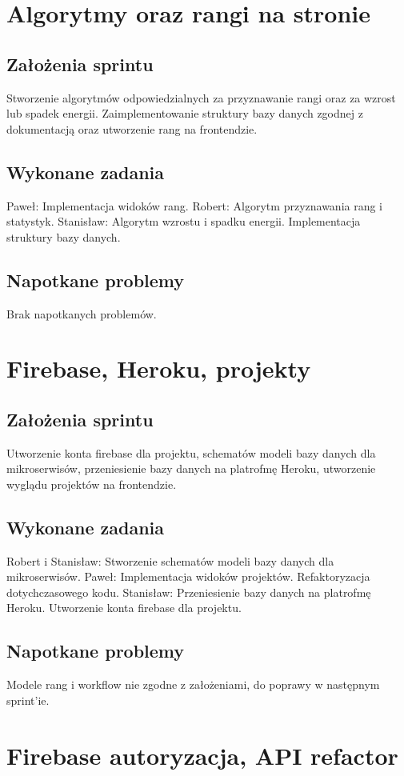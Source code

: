 \documentclass[a4paper,11pt]{report}
\begin{document}
\section {Algorytmy oraz rangi na stronie}
\subsection {Założenia sprintu}
Stworzenie algorytmów odpowiedzialnych za przyznawanie rangi oraz za wzrost lub spadek energii. Zaimplementowanie struktury bazy danych zgodnej z dokumentacją oraz utworzenie rang na frontendzie.
\subsection {Wykonane zadania}
Paweł: Implementacja widoków rang. 
Robert: Algorytm przyznawania rang i statystyk.
Stanisław: Algorytm wzrostu i spadku energii. Implementacja struktury bazy danych.
\subsection {Napotkane problemy}
Brak napotkanych problemów.

\section {Firebase, Heroku, projekty}
\subsection {Założenia sprintu}
Utworzenie konta firebase dla projektu, schematów modeli bazy danych dla mikroserwisów, przeniesienie bazy danych na platrofmę Heroku, utworzenie wyglądu projektów na frontendzie.
\subsection {Wykonane zadania}
Robert i Stanisław: Stworzenie schematów modeli bazy danych dla mikroserwisów.
Paweł: Implementacja widoków projektów. Refaktoryzacja dotychczasowego kodu. 
Stanisław: Przeniesienie bazy danych na platrofmę Heroku. Utworzenie konta firebase dla projektu.
\subsection {Napotkane problemy}
Modele rang i workflow nie zgodne z założeniami, do poprawy w następnym sprint'ie.

\section {Firebase autoryzacja, API refactor}
\end{document}
